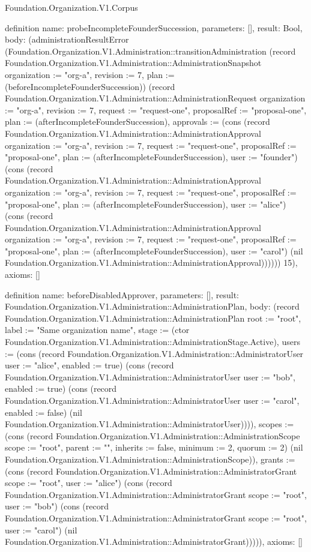 \begin{lexlean}{Foundation.Organization.V1.Corpus}
\begin{semanticmodule}
definition{
  name: probeIncompleteFounderSuccession,
  parameters: [],
  result: Bool,
  body: (administrationResultError (Foundation.Organization.V1.Administration::transitionAdministration (record Foundation.Organization.V1.Administration::AdministrationSnapshot {organization := "org-a", revision := 7, plan := (beforeIncompleteFounderSuccession)}) (record Foundation.Organization.V1.Administration::AdministrationRequest {organization := "org-a", revision := 7, request := "request-one", proposalRef := "proposal-one", plan := (afterIncompleteFounderSuccession), approvals := (cons (record Foundation.Organization.V1.Administration::AdministrationApproval {organization := "org-a", revision := 7, request := "request-one", proposalRef := "proposal-one", plan := (afterIncompleteFounderSuccession), user := "founder"}) (cons (record Foundation.Organization.V1.Administration::AdministrationApproval {organization := "org-a", revision := 7, request := "request-one", proposalRef := "proposal-one", plan := (afterIncompleteFounderSuccession), user := "alice"}) (cons (record Foundation.Organization.V1.Administration::AdministrationApproval {organization := "org-a", revision := 7, request := "request-one", proposalRef := "proposal-one", plan := (afterIncompleteFounderSuccession), user := "carol"}) (nil Foundation.Organization.V1.Administration::AdministrationApproval))))})) 15),
  axioms: []
}

definition{
  name: beforeDisabledApprover,
  parameters: [],
  result: Foundation.Organization.V1.Administration::AdministrationPlan,
  body: (record Foundation.Organization.V1.Administration::AdministrationPlan {root := "root", label := "Same organization name", stage := (ctor Foundation.Organization.V1.Administration::AdministrationStage.Active), users := (cons (record Foundation.Organization.V1.Administration::AdministratorUser {user := "alice", enabled := true}) (cons (record Foundation.Organization.V1.Administration::AdministratorUser {user := "bob", enabled := true}) (cons (record Foundation.Organization.V1.Administration::AdministratorUser {user := "carol", enabled := false}) (nil Foundation.Organization.V1.Administration::AdministratorUser)))), scopes := (cons (record Foundation.Organization.V1.Administration::AdministrationScope {scope := "root", parent := "", inherits := false, minimum := 2, quorum := 2}) (nil Foundation.Organization.V1.Administration::AdministrationScope)), grants := (cons (record Foundation.Organization.V1.Administration::AdministratorGrant {scope := "root", user := "alice"}) (cons (record Foundation.Organization.V1.Administration::AdministratorGrant {scope := "root", user := "bob"}) (cons (record Foundation.Organization.V1.Administration::AdministratorGrant {scope := "root", user := "carol"}) (nil Foundation.Organization.V1.Administration::AdministratorGrant))))}),
  axioms: []
}


\end{semanticmodule}
\end{lexlean}
